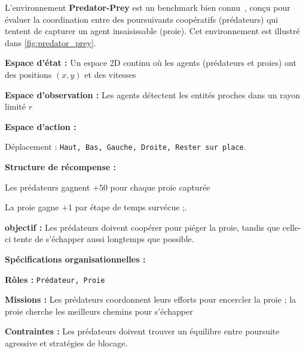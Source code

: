 L'environnement \textbf{Predator-Prey} est un benchmark  bien connu~\cite{lowe2017multi}, conçu pour évaluer la coordination entre des poursuivants coopératifs (prédateurs) qui tentent de capturer un agent insaisissable (proie). Cet environnement est illustré dans \autoref{fig:predator_prey}.
%
\begin{enumerate*}[label={\roman*)}, itemjoin={; \quad}]
  \item \textbf{Espace d'état :} Un espace 2D continu où les agents (prédateurs et proies) ont des positions $(x, y)$ et des vitesses
  \item \textbf{Espace d'observation :} Les agents détectent les entités proches dans un rayon limité $r$
  \item \textbf{Espace d'action :}
  \begin{enumerate*}[label={\roman*)}, itemjoin={; \quad}]
    \item Déplacement : \texttt{Haut, Bas, Gauche, Droite, Rester sur place}.
  \end{enumerate*}
  \item \textbf{Structure de récompense :}
  \begin{enumerate*}[label={\roman*)}, itemjoin={; \quad}]
    \item Les prédateurs gagnent $+50$ pour chaque proie capturée
    \item La proie gagne $+1$ par étape de temps survécue ;.
  \end{enumerate*}
  \item \textbf{objectif :} Les prédateurs doivent coopérer pour piéger la proie, tandis que celle-ci tente de s'échapper aussi longtemps que possible.
\end{enumerate*}
%
\textbf{Spécifications organisationnelles :}
\begin{enumerate*}[label={\roman*)}, itemjoin={; \quad}]
  \item \textbf{Rôles :} \texttt{Prédateur, Proie}
  \item \textbf{Missions :} Les prédateurs coordonnent leurs efforts pour encercler la proie ; la proie cherche les meilleurs chemins pour s'échapper
  \item \textbf{Contraintes :} Les prédateurs doivent trouver un équilibre entre poursuite agressive et stratégies de blocage.
\end{enumerate*}
%
